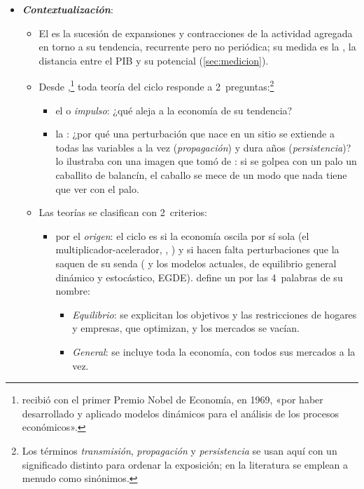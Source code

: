 \documentclass[11pt]{article}
\begin{document}
\begin{itemize}
\item \textbf{\emph{Contextualización}}:
  \begin{itemize}
  \item El  es la sucesión de expansiones y contracciones de la actividad agregada en torno a su tendencia, recurrente pero no periódica\nocite{BurnsMitchell1946Measuring}; su medida es la , la distancia entre el PIB y su potencial (\ref{sec:medicion}).
  \item Desde \textcite{Frisch1933Propagation},\footnote{ recibió con  el primer Premio Nobel de Economía, en 1969, «por haber desarrollado y aplicado modelos dinámicos para el análisis de los procesos económicos»\nocite{Nobel1969}.} toda teoría del ciclo responde a 2~preguntas:\footnote{Los términos \emph{transmisión}, \emph{propagación} y \emph{persistencia} se usan aquí con un significado distinto para ordenar la exposición; en la literatura se emplean a menudo como sinónimos.}
    \begin{itemize}
    \item el  o \emph{impulso}: ¿qué aleja a la economía de su tendencia?
    \item la : ¿por qué una perturbación que nace en un sitio se extiende a todas las variables a la vez (\emph{propagación}) y dura años (\emph{persistencia})?  lo ilustraba con una imagen que tomó de : si se golpea con un palo un caballito de balancín, el caballo se mece de un modo que nada tiene que ver con el palo.
    \end{itemize}
  \item Las teorías se clasifican con 2~criterios:
    \begin{itemize}
    \item por el \emph{origen}: el ciclo es  si la economía oscila por sí sola (el multiplicador-acelerador, , ) y  si hacen falta perturbaciones que la saquen de su senda ( y los modelos actuales, de equilibrio general dinámico y estocástico, EGDE). \textcite{Kocherlakota2010Modern} define un  por las 4~palabras de su nombre:
      \begin{itemize}
      \item \emph{Equilibrio}: se explicitan los objetivos y las restricciones de hogares y empresas, que optimizan, y los mercados se vacían.
      \item \emph{General}: se incluye toda la economía, con todos sus mercados a la vez.

\end{itemize}
\end{itemize}
\end{itemize}
\end{itemize}
\end{document}
